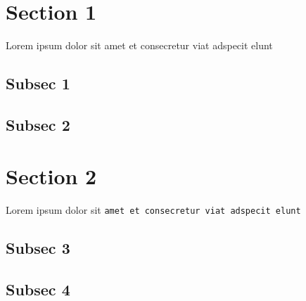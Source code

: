 \section{Section 1}
   Lorem ipsum dolor sit amet et consecretur viat adspecit elunt

   \subsection{Subsec 1}

   \subsection{Subsec 2}

\section{Section 2}
   Lorem ipsum dolor sit \tt{amet} et consecretur viat adspecit elunt

   \subsection{Subsec 3}

   \subsection{Subsec 4}
